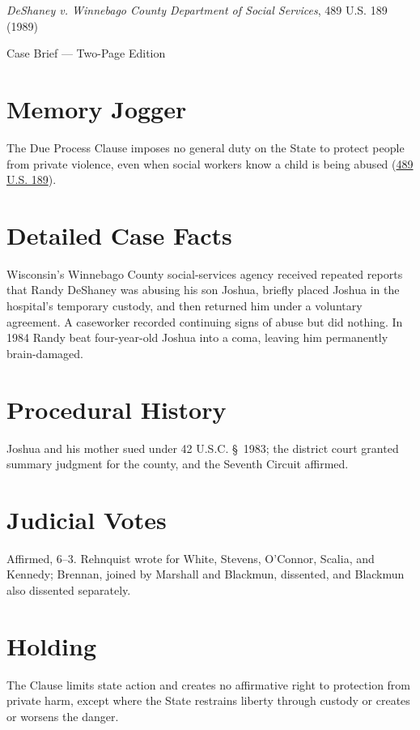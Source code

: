 \documentclass[12pt]{article}
\begin{document}
\begin{center}
{\LARGE \textit{DeShaney v. Winnebago County Department of Social Services}, 489 U.S. 189 (1989)\par}
\vspace{0.5em}
{\large Case Brief --- Two-Page Edition\par}
\end{center}

\section{Memory Jogger}
The Due Process Clause imposes no general duty on the State to protect people from private violence, even when social workers know a child is being abused (\href{https://supreme.justia.com/cases/federal/us/489/189/}{489 U.S. 189}).

\section{Detailed Case Facts}
Wisconsin's Winnebago County social-services agency received repeated reports that Randy DeShaney was abusing his son Joshua, briefly placed Joshua in the hospital's temporary custody, and then returned him under a voluntary agreement. A caseworker recorded continuing signs of abuse but did nothing. In 1984 Randy beat four-year-old Joshua into a coma, leaving him permanently brain-damaged.

\section{Procedural History}
Joshua and his mother sued under 42 U.S.C. \S~1983; the district court granted summary judgment for the county, and the Seventh Circuit affirmed.

\section{Judicial Votes}
Affirmed, 6--3. Rehnquist wrote for White, Stevens, O'Connor, Scalia, and Kennedy; Brennan, joined by Marshall and Blackmun, dissented, and Blackmun also dissented separately.

\section{Holding}
The Clause limits state action and creates no affirmative right to protection from private harm, except where the State restrains liberty through custody or creates or worsens the danger.
\end{document}
